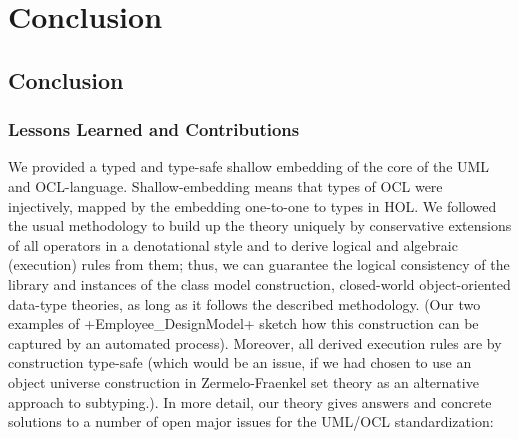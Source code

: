 \part{Conclusion}

\chapter{Conclusion}

\section{Lessons Learned and Contributions}
We provided a typed and type-safe shallow embedding 
of the core of the UML and OCL-language. Shallow-embedding means
that types of OCL were injectively,\ie{} mapped by the embedding
one-to-one to types in HOL. We followed the usual methodology to
build up the theory uniquely by conservative extensions
of all operators in a denotational style 
and to derive logical and algebraic (execution) rules
from them; thus, we can guarantee the logical consistency 
of the library and instances of the class model construction,
  \ie{} closed-world object-oriented data-type theories,
  as long as it follows the described methodology.
(Our two examples of \inlineisar+Employee_DesignModel+ sketch
  how this construction can be captured by an automated process).
Moreover, all derived execution rules are by construction
type-safe (which would be an issue, if we had chosen
  to use an object universe construction in Zermelo-Fraenkel
  set theory as an alternative approach to subtyping.).
In more detail, our theory gives answers and concrete
solutions to a number of open major issues for the UML/OCL standardization:
